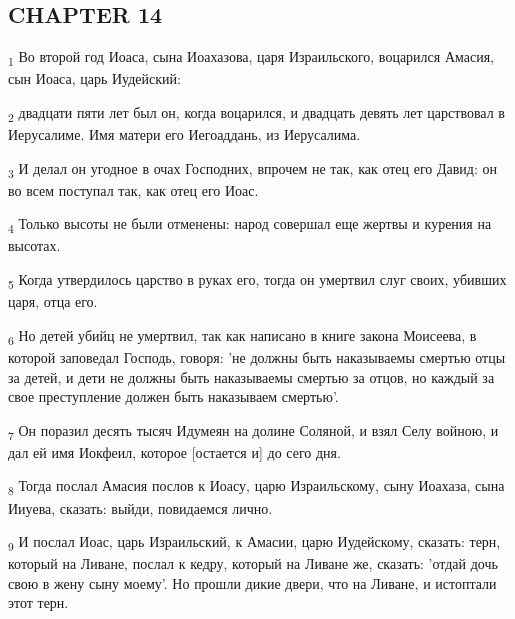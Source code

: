 \subsection{CHAPTER 14}
\begin{tcolorbox}
\textsubscript{1} Во второй год Иоаса, сына Иоахазова, царя Израильского, воцарился Амасия, сын Иоаса, царь Иудейский:
\end{tcolorbox}
\begin{tcolorbox}
\textsubscript{2} двадцати пяти лет был он, когда воцарился, и двадцать девять лет царствовал в Иерусалиме. Имя матери его Иегоаддань, из Иерусалима.
\end{tcolorbox}
\begin{tcolorbox}
\textsubscript{3} И делал он угодное в очах Господних, впрочем не так, как отец его Давид: он во всем поступал так, как отец его Иоас.
\end{tcolorbox}
\begin{tcolorbox}
\textsubscript{4} Только высоты не были отменены: народ совершал еще жертвы и курения на высотах.
\end{tcolorbox}
\begin{tcolorbox}
\textsubscript{5} Когда утвердилось царство в руках его, тогда он умертвил слуг своих, убивших царя, отца его.
\end{tcolorbox}
\begin{tcolorbox}
\textsubscript{6} Но детей убийц не умертвил, так как написано в книге закона Моисеева, в которой заповедал Господь, говоря: 'не должны быть наказываемы смертью отцы за детей, и дети не должны быть наказываемы смертью за отцов, но каждый за свое преступление должен быть наказываем смертью'.
\end{tcolorbox}
\begin{tcolorbox}
\textsubscript{7} Он поразил десять тысяч Идумеян на долине Соляной, и взял Селу войною, и дал ей имя Иокфеил, которое [остается и] до сего дня.
\end{tcolorbox}
\begin{tcolorbox}
\textsubscript{8} Тогда послал Амасия послов к Иоасу, царю Израильскому, сыну Иоахаза, сына Ииуева, сказать: выйди, повидаемся лично.
\end{tcolorbox}
\begin{tcolorbox}
\textsubscript{9} И послал Иоас, царь Израильский, к Амасии, царю Иудейскому, сказать: терн, который на Ливане, послал к кедру, который на Ливане же, сказать: 'отдай дочь свою в жену сыну моему'. Но прошли дикие двери, что на Ливане, и истоптали этот терн.
\end{tcolorbox}

